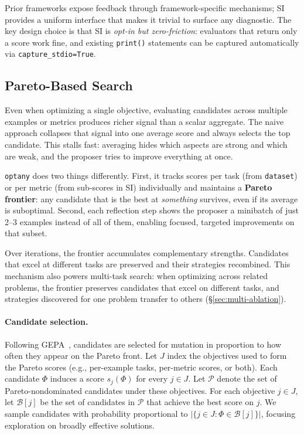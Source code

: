 \documentclass[sigconf,anonymous,review]{acmart}
\newcommand{\oa}{\texttt{optany}}
\newcommand{\asi}{SI}
\begin{document}
Prior frameworks expose feedback through framework-specific mechanisms; \asi{} provides a uniform interface that makes it trivial to surface any diagnostic. The key design choice is that \asi{} is \emph{opt-in but zero-friction}: evaluators that return only a score work fine, and existing \texttt{print()} statements can be captured automatically via \texttt{capture\_stdio=True}.

\subsection{Pareto-Based Search}\label{sec:pareto}

Even when optimizing a single objective, evaluating candidates across multiple examples or metrics produces richer signal than a scalar aggregate. The naive approach collapses that signal into one average score and always selects the top candidate. This stalls fast: averaging hides which aspects are strong and which are weak, and the proposer tries to improve everything at once.

\oa{} does two things differently. First, it tracks scores per task (from \texttt{dataset}) or per metric (from sub-scores in \asi{}) individually and maintains a \textbf{Pareto frontier}: any candidate that is the best at \emph{something} survives, even if its average is suboptimal. Second, each reflection step shows the proposer a minibatch of just 2--3 examples instead of all of them, enabling focused, targeted improvements on that subset.

Over iterations, the frontier accumulates complementary strengths. Candidates that excel at different tasks are preserved and their strategies recombined. This mechanism also powers multi-task search: when optimizing across related problems, the frontier preserves candidates that excel on different tasks, and strategies discovered for one problem transfer to others (\S\ref{sec:multi-ablation}).

\paragraph{Candidate selection.} Following GEPA~\cite{agrawal2026gepa}, candidates are selected for mutation in proportion to how often they appear on the Pareto front. Let $J$ index the objectives used to form the Pareto scores (e.g., per-example tasks, per-metric scores, or both). Each candidate $\Phi$ induces a score $s_j(\Phi)$ for every $j\in J$. Let $\mathcal{P}$ denote the set of Pareto-nondominated candidates under these objectives. For each objective $j\in J$, let $\mathcal{B}[j]$ be the set of candidates in $\mathcal{P}$ that achieve the best score on $j$. We sample candidates with probability proportional to $|\{j\in J : \Phi \in \mathcal{B}[j]\}|$, focusing exploration on broadly effective solutions.
\end{document}
